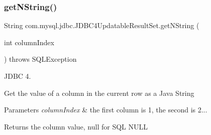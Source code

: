 \subsubsection{\texorpdfstring{get\+N\+String()}{getNString()}\hspace{0.1cm}{\footnotesize\ttfamily [1/2]}}
{\footnotesize\ttfamily String com.\+mysql.\+jdbc.\+J\+D\+B\+C4\+Updatable\+Result\+Set.\+get\+N\+String (\begin{DoxyParamCaption}\item[{int}]{column\+Index }\end{DoxyParamCaption}) throws S\+Q\+L\+Exception}

J\+D\+BC 4.

Get the value of a column in the current row as a Java String


\begin{DoxyParams}{Parameters}
{\em column\+Index} & the first column is 1, the second is 2...\\
\hline
\end{DoxyParams}
\begin{DoxyReturn}{Returns}
the column value, null for S\+QL N\+U\+LL
\end{DoxyReturn}

